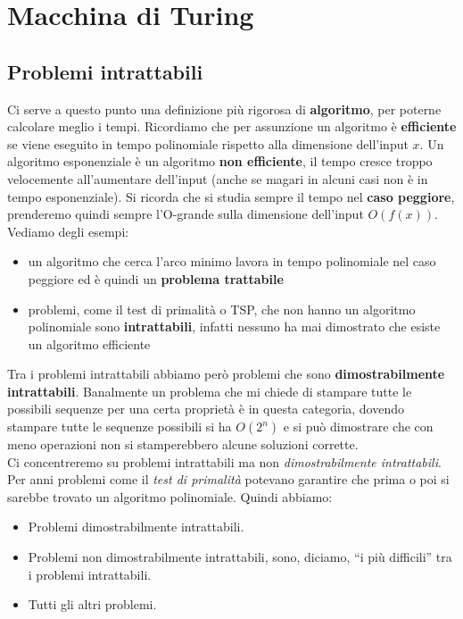 
\chapter{Macchina di Turing}

\label{Capitolo 3}
\section{Problemi intrattabili}
Ci serve a questo punto una definizione più rigorosa di \textbf{algoritmo}, per
poterne calcolare meglio i tempi. Ricordiamo che per assunzione un algoritmo è
\textbf{efficiente} se viene eseguito in tempo polinomiale rispetto alla dimensione
dell'input $x$. Un algoritmo esponenziale è un
algoritmo \textbf{non efficiente}, il tempo cresce troppo velocemente
all'aumentare dell'input (anche se magari in alcuni casi non è in tempo
esponenziale). Si ricorda che si studia sempre il tempo nel 
\textbf{caso peggiore}, prenderemo quindi sempre l'O-grande sulla dimensione
dell'input $O(f(x))$.\\
Vediamo degli esempi:
\begin{itemize}
  \item un algoritmo che cerca l'arco minimo lavora in tempo polinomiale nel
  caso peggiore ed è quindi un \textbf{problema trattabile}
  \item problemi, come il test di primalità o TSP, che non hanno un algoritmo
  polinomiale sono \textbf{intrattabili}, infatti nessuno ha mai dimostrato che
  esiste un algoritmo efficiente
\end{itemize}
Tra i problemi intrattabili abbiamo però problemi che sono
\textbf{dimostrabilmente intrattabili}. Banalmente un problema che mi chiede di
stampare tutte le possibili sequenze per una certa proprietà è in questa
categoria, dovendo stampare tutte le sequenze possibili si ha $O(2^n)$ e si può
dimostrare che con meno operazioni non si stamperebbero alcune soluzioni
corrette.\\
Ci concentreremo su problemi intrattabili ma non \textit{dimostrabilmente
  intrattabili}.\\
Per anni problemi come il \textit{test di primalità} potevano garantire che
prima o poi si sarebbe trovato un algoritmo polinomiale. Quindi abbiamo:
\begin{itemize}
  \item Problemi dimostrabilmente intrattabili.
  \item Problemi non dimostrabilmente intrattabili, sono, diciamo, ``i più
  difficili'' tra i problemi intrattabili.
  \item Tutti gli altri problemi.
\end{itemize}
